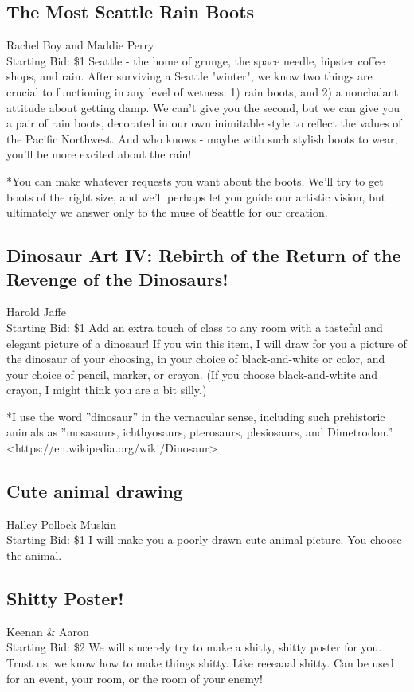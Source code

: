 \documentclass[11pt]{article}
\begin{document}
\subsection{The Most Seattle Rain Boots}
Rachel Boy and Maddie Perry
\\
Starting Bid: \$1
\newline
Seattle - the home of grunge, the space needle, hipster coffee shops, and rain. After surviving a Seattle "winter", we know two things are crucial to functioning in any level of wetness: 1) rain boots, and 2) a nonchalant attitude about getting damp. We can't give you the second, but we can give you a pair of rain boots, decorated in our own inimitable style to reflect the values of the Pacific Northwest. And who knows - maybe with such stylish boots to wear, you'll be more excited about the rain!

*You can make whatever requests you want about the boots. We'll try to get boots of the right size, and we'll perhaps let you guide our artistic vision, but ultimately we answer only to the muse of Seattle for our creation.
\subsection{Dinosaur Art IV: Rebirth of the Return of the Revenge of the Dinosaurs!}
Harold Jaffe
\\
Starting Bid: \$1
\newline
Add an extra touch of class to any room with a tasteful and elegant picture of a dinosaur! If you win this item, I will draw for you a picture of the dinosaur of your choosing, in your choice of black-and-white or color, and your choice of pencil, marker, or crayon. (If you choose black-and-white and crayon, I might think you are a bit silly.)

*I use the word ”dinosaur” in the vernacular sense, including such prehistoric animals as ”mosasaurs, ichthyosaurs, pterosaurs, plesiosaurs, and Dimetrodon.” \textless https://en.wikipedia.org/wiki/Dinosaur\textgreater
\subsection{Cute animal drawing}
Halley Pollock-Muskin
\\
Starting Bid: \$1
\newline
I will make you a poorly drawn cute animal picture. You choose the animal.
\subsection{Shitty Poster!}
Keenan \& Aaron
\\
Starting Bid: \$2
\newline
We will sincerely try to make a shitty, shitty poster for you. Trust us, we know how to make things shitty. Like reeeaaal shitty. Can be used for an event, your room, or the room of your enemy!
\end{document}
